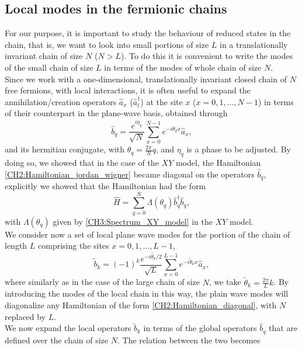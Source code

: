 \subsection{Local modes in the fermionic chains}
For our purpose, it is important to study the behaviour of reduced states in the chain, that is, we want to look into small portions of size $L$ in a translationally invariant chain of size $N$ ($N>L$). To do this it is convenient to write the modes of the small chain of size $L$ in terms of the modes of whole chain of size $N$.\\
\indent Since we work with a one-dimensional, translationally invariant closed chain of $N$ free fermions, with local interactions, it is often useful to expand the annihilation/creation operators $\hat{a}_x$ ($\hat{a}^{\dagger}_l$) at the site $x$ ($x = 0,1,\ldots, N-1$) in terms of their counterpart in the plane-wave basis, obtained through
\begin{equation}
\hat{b}_{q} = \frac{e^{i\eta_q}}{\sqrt{N}}\sum_{x=0}^{N-1}e^{-i\theta_q x}\hat{a}_x,
\end{equation}
and its hermitian conjugate, with $\theta_q = \frac{2\pi}{N}q$, and $\eta_q$ is a phase to be adjusted. By doing so, we showed that in the case of the $XY$ model, the Hamiltonian \eqref{CH2:Hamiltonian_jordan_wigner} became diagonal on the operators $\hat{b}_q$, explicitly we showed that the Hamiltonian had the form
\begin{equation}
\hat{H} = \sum_{q=0}^{N} \Lambda(\theta_q)\hat{b}_q^{\dagger}\hat{b}_q,
\label{CH2:Hamiltonian_diagonal}
\end{equation}
with $\Lambda(\theta_q)$ given by \eqref{CH3:Spectrum_XY_model} in the $XY$ model.\\
\indent We consider now a set of local plane wave modes for the portion of the chain of length $L$ comprising the sites $x=0,1,\ldots,L-1$,
\begin{equation}
\tilde{b}_k = (-1)^{k}\frac{e^{-i\tilde{\theta_k}/2}}{\sqrt{L}}\sum_{x=0}^{L-1}e^{-i\tilde{\theta}_k x}\hat{a}_x,
\end{equation}
where similarly as in the case of the large chain of size $N$, we take $\tilde{\theta}_k = \frac{2\pi}{L}k$. By introducing the modes of the local chain in this way, the plain wave modes will diagonalize any Hamiltonian of the form \eqref{CH2:Hamiltonian_diagonal}, with $N$ replaced by $L$.\\
\indent We now expand the local operators $\tilde{b}_k$ in terms of the global operators $\hat{b}_q$ that are defined over the chain of size $N$. The relation between the two becomes
